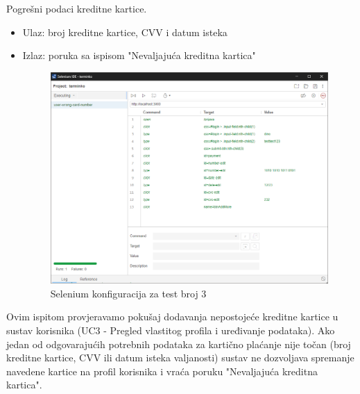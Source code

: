 \begin{packed_enum}
	 		\item Pogrešni podaci kreditne kartice.
	 		\begin{itemize}
	 			\item Ulaz: broj kreditne kartice, CVV i datum isteka
	 			\item Izlaz: poruka sa ispisom "Nevaljajuća kreditna kartica"
	 			\begin{figure}[H]
	 				\includegraphics[width=0.95\linewidth]{slike/test2.png}
	 				\centering
	 				\caption{Selenium konfiguracija za test broj 3}
	 				\label{fig:dijagram_razmjestaja}
	 			\end{figure}
	 		\end{itemize}
 			Ovim ispitom provjeravamo pokušaj dodavanja nepostojeće kreditne kartice u sustav korisnika (UC3 - Pregled vlastitog profila i uređivanje podataka). Ako jedan od odgovarajućih potrebnih podataka za kartično plaćanje nije točan (broj kreditne kartice, CVV ili datum isteka valjanosti) sustav ne dozvoljava spremanje navedene kartice na profil korisnika i vraća poruku "Nevaljajuća kreditna kartica".
 			\eject
			 	

\end{packed_enum}
